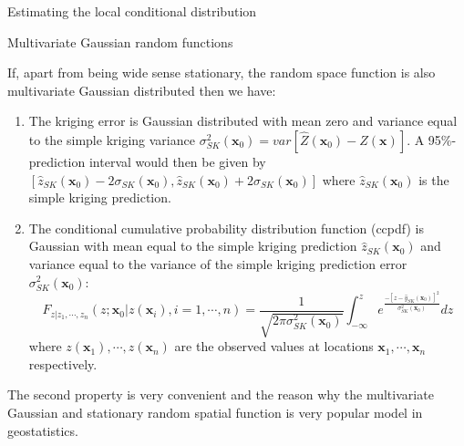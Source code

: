 \documentclass[8pt]{beamer}
\renewcommand{\emph}[1]{\textcolor{myorange}{#1}}
\begin{document}
\begin{frame}{Estimating the local conditional distribution}
    \begin{block}{Multivariate Gaussian random functions}
    \end{block}
    If, apart from being \emph{wide sense stationary}, the \emph{random space function} is also \emph{multivariate Gaussian distributed} then we have:
    \begin{enumerate}
        \item The \emph{kriging error} is \emph{Gaussian distributed} with \emph{mean} zero and \emph{variance} equal to the \emph{simple kriging variance} $\sigma_{SK}^2 (\mathbf{x}_0) = var\left[\hat{Z}(\mathbf{x}_0) - Z(\mathbf{x})\right]$.  A \emph{95\%-prediction interval} would then be given by $\left[ \hat{z}_{SK}(\mathbf{x}_0) - 2\sigma_{SK}(\mathbf{x}_0), \hat{z}_{SK}(\mathbf{x}_0)+ 2\sigma_{SK}(\mathbf{x}_0) \right]$ where $\hat{z}_{SK}(\mathbf{x}_0)$ is the \emph{simple kriging prediction}.
        \item The \emph{conditional cumulative probability distribution function (ccpdf)} is \emph{Gaussian} with \emph{mean} equal to the \emph{simple kriging prediction} $\hat{z}_{SK}(\mathbf{x}_0)$ and \emph{variance} equal to the \emph{variance of the simple kriging prediction error} $\sigma_{SK}^2(\mathbf{x}_0)$:
  \begin{equation}
                    F_{z|z_1,\cdots,z_n} (z; \mathbf{x}_0 | z(\mathbf{x}_i), i=1,\cdots,n) = \frac{1}{\sqrt{2\pi \sigma_{SK}^2 (\mathbf{x}_0)}} \int_{-\infty}^z e^{\frac{-\left[z-\hat{y}_{SK}(\mathbf{x}_0) \right]^2}{\sigma_{SK}^2 (\mathbf{x}_0)}} dz
                \label{e731}
            \end{equation}
            where $z(\mathbf{x}_1),\cdots,z(\mathbf{x}_n)$ are the observed values at locations $\mathbf{x}_1 ,\cdots,\mathbf{x}_n$ respectively.
           
    \end{enumerate}
    The second property is very convenient and the reason why the \emph{multivariate Gaussian} and \emph{stationary random spatial function} is very popular model in \emph{geostatistics}.
\end{frame}
\end{document}
